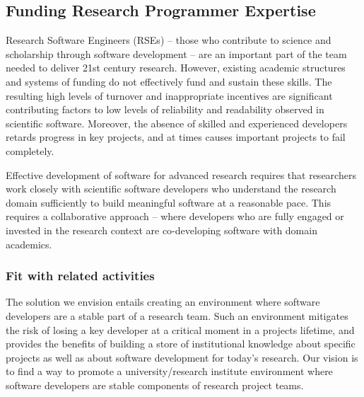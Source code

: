 \subsection{Funding Research Programmer Expertise}
\label{RSE}



Research Software Engineers (RSEs) -- those who contribute to science and scholarship
through software development -- are an important part of the team needed to
deliver 21st century research. However, existing academic structures and systems
of funding do not effectively fund and sustain these skills. The resulting high
levels of turnover and inappropriate incentives are significant contributing
factors to low levels of reliability and readability observed in scientific
software. Moreover, the absence of skilled and experienced developers retards
progress in key projects, and at times causes important projects to fail
completely.

Effective development of software for advanced research requires that
researchers work closely with scientific software developers who understand the
research domain sufficiently to build meaningful software at a reasonable pace.
This requires a collaborative approach -- where developers who are fully
engaged or invested in the research context are co-developing software with domain
academics.

\subsubsection{Fit with related activities}

The solution we envision entails creating an environment where software
developers are a stable part of a research team. Such an environment mitigates
the risk of losing a key developer at a critical moment in a projects lifetime,
and provides the benefits of building a store of institutional knowledge about
specific projects as well as about software development for today's research.
Our vision is to find a way to promote a university/research institute
environment where software developers are stable components of research project
teams.

